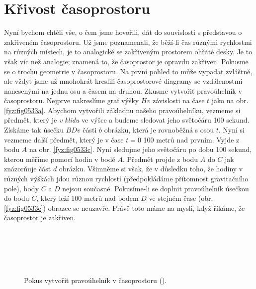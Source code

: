   \section{Křivost časoprostoru}\label{fyz:IIchapXVLIIsecVII}
    Nyní bychom chtěli vše, o čem jsme hovořili, dát do souvislosti s představou o zakřiveném 
    časoprostoru. Už jsme poznamenali, že běží-li čas různými rychlostmi na různých místech, je to 
    analogické se zakřiveným prostorem ohřáté desky. Je to však víc než analogie; znamená to, že 
    časoprostor je opravdu zakřiven. Pokusme se o trochu geometrie v časoprostoru. Na první pohled 
    to může vypadat zvláštně, ale vždyť jsme už mnohokrát kreslili časoprostorové diagramy se 
    vzdálenostmi nanesenými na jednu osu a časem na druhou. Zkusme vytvořit pravoúhelník v 
    časoprostoru. Nejprve nakreslíme graf výšky \(Hv\) závislosti na čase \(t\) jako na obr. 
    \ref{fyz:fig0533a}. Abychom vytvořili základnu našeho pravoúhelníku, vezmeme si předmět, který 
    je \emph{v klidu} ve výšce a budeme sledovat jeho světočáru \num{100} sekund. Získáme tak 
    úsečku \(BDv\) části \(b\) obrázku, která je rovnoběžná s osou \(t\). Nyní si vezmeme další 
    předmět, který je v čase \(t = 0\) \num{100} metrů nad prvním. Vyjde z bodu \(A\) na obr. 
    \ref{fyz:fig0533c}. Nyní sledujme jeho světočáru po dobu \num{100} sekund, kterou měříme pomocí 
    hodin v bodě \(A\). Předmět projde z bodu \(A\) do \(C\) jak znázorňuje část \(d\) obrázku. 
    Všimněme si však, že v důsledku toho, že hodiny v různých výškách jdou různou rychlostí 
    (předpokládáme přítomnost gravitačního pole), body \(C\) a \(D\) nejsou současné. Pokusíme-li 
    se doplnit pravoúhelník úsečkou do bodu \(C\), který leží \num{100} metrů nad bodem \(D\) ve 
    stejném čase (obr. \ref{fyz:fig0533e}) obrazec se neuzavře. Právě toto máme na mysli, když 
    říkáme, že časoprostor je zakřiven.
    
    \begin{figure}[ht!] %
      \centering  
          \\
          \\
          \\
          \\
      \caption{Pokus vytvořit pravoúhelník v časoprostoru (\cite[s.~790]{Feynman02}).}
      \label{fyz:fig0533}
    \end{figure}     

